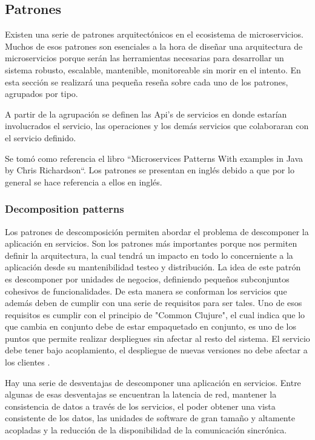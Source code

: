\subsection{Patrones}
Existen una serie de patrones arquitectónicos en el ecosistema de microservicios.
Muchos de esos patrones son esenciales a la hora de diseñar una arquitectura de microservicios porque serán las herramientas
necesarias para desarrollar un sistema robusto, escalable, mantenible, monitoreable sin morir en el intento.
En esta sección se realizará una pequeña reseña sobre cada uno de los patrones, agrupados por tipo.\par
A partir de la agrupación se definen las Api's de servicios en donde estarían involucrados el servicio, las operaciones y los demás servicios que colaboraran con el servicio definido.\par
Se tomó como referencia el libro “Microservices Patterns With examples in Java by Chris Richardson“\cite{micropatterns}. Los patrones se presentan en inglés debido a que por lo general se hace referencia a ellos en inglés.\par

\subsubsection{Decomposition patterns} 
Los patrones de descomposición permiten abordar el problema de descomponer la aplicación en servicios. Son los patrones más importantes porque nos permiten definir la arquitectura, la cual tendrá un impacto en todo lo concerniente a la aplicación desde su mantenibilidad testeo y distribución.
La idea de este patrón es descomponer por unidades de negocios, definiendo pequeños subconjuntos cohesivos de funcionalidades. De esta manera se conforman los servicios que además deben de cumplir con una serie de requisitos para ser tales. Uno de esos requisitos es cumplir con el principio de "Common Clujure", el cual indica que lo que cambia en conjunto debe de estar empaquetado en conjunto, es uno de los puntos que permite realizar despliegues sin afectar al resto del sistema. El servicio debe tener bajo acoplamiento, el despliegue de nuevas versiones no debe afectar a los clientes \cite{microDescompose}.\par
Hay una serie de  desventajas de descomponer una aplicación en servicios. Entre algunas de esas desventajas se encuentran la latencia de red, mantener la consistencia de datos a través de los servicios, el poder obtener una vista consistente de los datos, las unidades de software de gran tamaño y altamente acopladas y la reducción de la disponibilidad de la comunicación sincrónica.\par 

